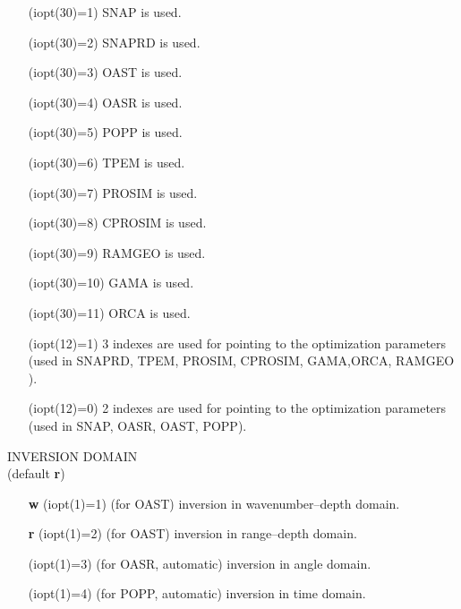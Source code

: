 \documentclass{saclantc}
\begin{document}
\vspace{-0.6cm}
\begin{itemize}
    \item[] (iopt(30)=1) {\sf SNAP} is used.
\vspace{-0.3cm}
    \item[] (iopt(30)=2) {\sf SNAPRD} is used.
\vspace{-0.3cm}
    \item[] (iopt(30)=3) {\sf OAST} is used.
\vspace{-0.3cm}
    \item[] (iopt(30)=4) {\sf OASR} is used.
\vspace{-0.3cm}
    \item[] (iopt(30)=5) {\sf POPP} is used.
\vspace{-0.3cm}
    \item[] (iopt(30)=6) {\sf TPEM} is used.
\vspace{-0.3cm}
    \item[] (iopt(30)=7) {\sf PROSIM} is used.
\vspace{-0.3cm}
    \item[] (iopt(30)=8) {\sf CPROSIM} is used.
\vspace{-0.3cm}
    \item[] (iopt(30)=9) {\sf RAMGEO} is used.
\vspace{-0.3cm}
    \item[] (iopt(30)=10) {\sf GAMA} is used.
\vspace{-0.3cm}
    \item[] (iopt(30)=11) {\sf ORCA} is used.
    \item[] (iopt(12)=1) 3 indexes are used for 
  pointing to the optimization parameters (used in {\sf SNAPRD}, {\sf
  TPEM}, {\sf PROSIM}, {\sf CPROSIM}, {\sf GAMA},{\sf ORCA}, {\sf RAMGEO} ).
\vspace{-0.3cm}
    \item[] (iopt(12)=0) 2 indexes are used for 
  pointing to the optimization parameters (used in {\sf SNAP}, {\sf OASR}, {\sf OAST}, {\sf POPP}).
\end{itemize}
\noindent INVERSION DOMAIN \\
(default {\bf r})

\vspace{-0.6cm}
\begin{itemize}
    \item[{\bf w}] (iopt(1)=1) (for {\sf OAST}) inversion in wavenumber--depth domain.
\vspace{-0.3cm}
    \item[{\bf r}] (iopt(1)=2) (for {\sf OAST}) inversion in range--depth domain.
\vspace{-0.3cm}
    \item[ ] (iopt(1)=3) (for {\sf OASR}, automatic) inversion in
angle domain.
\vspace{-0.3cm}
    \item[ ] (iopt(1)=4) (for {\sf POPP}, automatic) inversion in time
domain.
\end{itemize}
\end{document}
